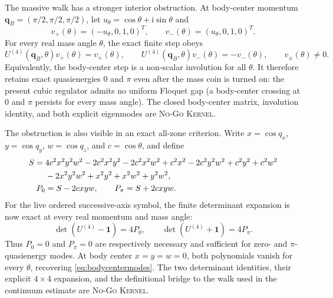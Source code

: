 \documentclass[11pt]{article}
\newcommand{\Kernel}{\textcolor{kernelcolor}{\textsc{Kernel}}}
\newcommand{\NoGo}{\textsc{No-Go}}
\newcommand{\ii}{\mathrm{i}}
\newcommand{\id}{\mathbf{1}}
\begin{document}
The massive walk has a stronger interior obstruction.  At body-center momentum
$\mathbf q_B=(\pi/2,\pi/2,\pi/2)$, let
$u_\theta=\cos\theta+\ii\sin\theta$ and
\[
 v_+(\theta)=(-u_\theta,0,1,0)^T,
 \qquad
 v_-(\theta)=(u_\theta,0,1,0)^T.
\]
For every real mass angle $\theta$, the exact finite step obeys
\begin{equation}\label{eq:bodycentermodes}
 U^{(4)}(\mathbf q_B,\theta)v_+(\theta)=v_+(\theta),
 \qquad
 U^{(4)}(\mathbf q_B,\theta)v_-(\theta)=-v_-(\theta),
 \qquad v_\pm(\theta)\neq0.
\end{equation}
Equivalently, the body-center step is a non-scalar involution for all
$\theta$.  It therefore retains exact quasienergies $0$ and $\pi$ even after
the mass coin is turned on: the present cubic regulator admits no uniform
Floquet gap (a body-center crossing at $0$ and $\pi$ persists for every
mass angle).
The closed body-center matrix, involution identity, and both explicit
eigenmodes are \NoGo{} \Kernel{}.

The obstruction is also visible in an exact all-zone criterion.  Write
$x=\cos q_x$, $y=\cos q_y$, $w=\cos q_z$, and $c=\cos\theta$, and define
\begin{align}
 S={}&4c^2x^2y^2w^2-2c^2x^2y^2-2c^2x^2w^2+c^2x^2
      -2c^2y^2w^2+c^2y^2+c^2w^2 \notag\\
   &{}-2x^2y^2w^2+x^2y^2+x^2w^2+y^2w^2,\\
 P_0&=S-2cxyw,
 \qquad
 P_\pi=S+2cxyw.
\end{align}
For the live ordered successive-axis symbol, the finite determinant expansion
is now exact at every real momentum and mass angle:
\begin{equation}\label{eq:fullblochdet}
 \det\!\left(U^{(4)}-\id\right)=4P_0,
 \qquad
 \det\!\left(U^{(4)}+\id\right)=4P_\pi.
\end{equation}
Thus $P_0=0$ and $P_\pi=0$ are respectively necessary and sufficient for
zero- and $\pi$-quasienergy modes.  At body center $x=y=w=0$, both polynomials
vanish for every $\theta$, recovering \eqref{eq:bodycentermodes}.  The two
determinant identities, their explicit $4\times4$ expansion, and the
definitional bridge to the walk used in the continuum estimate are
\NoGo{} \Kernel{}.
\end{document}
